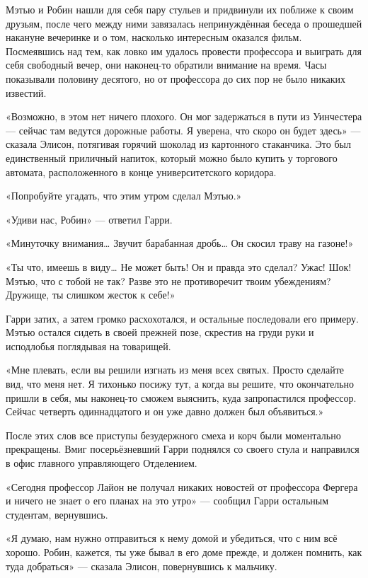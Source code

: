 \documentclass[a5paper, 9pt,
final, openany, twoside=true]{memoir}
\begin{document}
Мэтью и Робин нашли для себя пару стульев и придвинули их поближе к своим друзьям, после чего между ними завязалась непринуждённая беседа о прошедшей накануне вечеринке и о том, насколько интересным оказался фильм. Посмеявшись над тем, как ловко им удалось провести профессора и выиграть для себя свободный вечер, они наконец-то обратили внимание на время. Часы показывали половину десятого, но от профессора до сих пор не было никаких известий.

«Возможно, в этом нет ничего плохого. Он мог задержаться в пути из Уинчестера — сейчас там ведутся дорожные работы. Я уверена, что скоро он будет здесь» — сказала Элисон, потягивая горячий шоколад из картонного стаканчика. Это был единственный приличный напиток, который можно было купить у торгового автомата, расположенного в конце университетского коридора.

«Попробуйте угадать, что этим утром сделал Мэтью.»

«Удиви нас, Робин» — ответил Гарри.

«Минуточку внимания…  Звучит барабанная дробь… Он скосил траву на газоне!»

«Ты что, имеешь в виду… Не может быть! Он и правда это сделал? Ужас! Шок! Мэтью, что с тобой не так? Разве это не противоречит твоим убеждениям? Дружище, ты слишком жесток к себе!»

Гарри затих, а затем громко расхохотался, и остальные последовали его примеру. Мэтью остался сидеть в своей прежней позе, скрестив на груди руки и исподлобья поглядывая на товарищей.

«Мне плевать, если вы решили изгнать из меня всех святых. Просто сделайте вид, что меня нет. Я тихонько посижу тут, а когда вы решите, что окончательно пришли в себя, мы наконец-то сможем выяснить, куда запропастился профессор. Сейчас четверть одиннадцатого и он уже давно должен был объявиться.»

После этих слов все приступы безудержного смеха и корч были моментально прекращены. Вмиг посерьёзневший Гарри поднялся со своего стула и направился в офис главного управляющего Отделением.\bigskip

«Сегодня профессор Лайон не получал никаких новостей от профессора Фергера и ничего не знает о его планах на это утро» — сообщил Гарри остальным студентам, вернувшись.

«Я думаю, нам нужно отправиться к нему домой и убедиться, что с ним всё хорошо. Робин, кажется, ты уже бывал в его доме прежде, и должен помнить, как туда добраться» — сказала Элисон, повернувшись к мальчику.
\end{document}
